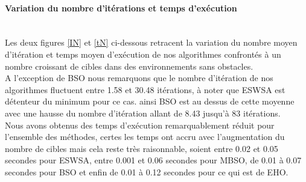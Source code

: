  

\noindent
	\paragraph{Variation du nombre d'itérations et temps d'exécution}
	\textbf{ }\\
	
	Les deux figures \ref{IN} et \ref{tN} ci-dessous retracent la variation du nombre moyen d'itération et temps moyen d'exécution de nos algorithmes confrontés à un nombre croissant de cibles dans des environnements sans obstacles.\\
	
	
	A l'exception de BSO nous remarquons que le nombre d'itération de nos algorithmes fluctuent entre 1.58 et 30.48 itérations, à noter que ESWSA est détenteur du minimum pour ce cas. ainsi BSO est au dessus de cette moyenne avec une hausse du nombre d'itération allant de 8.43 jusqu'à 83 itérations.\\
	
	Nous avons obtenus des temps d'exécution remarquablement réduit pour l'ensemble des méthodes, certes les temps ont accru avec l'augmentation du nombre de cibles mais cela reste très raisonnable, soient entre 0.02 et 0.05 secondes pour ESWSA, entre 0.001 et 0.06 secondes pour MBSO, de 0.01 à 0.07 secondes pour BSO et enfin de 0.01 à 0.12 secondes pour ce qui est de EHO.




\noindent
\begin{minipage}[t]{0.55\textwidth}
	\captionsetup{width=0.8\linewidth}
	\centering{}
	\label{IN}
\end{minipage}\hfill
\hspace{-0.5cm}
\begin{minipage}[t]{0.55\textwidth}
	\captionsetup{width=0.8\linewidth}
	\centering{}
	\label{tN}
\end{minipage}\hfill





